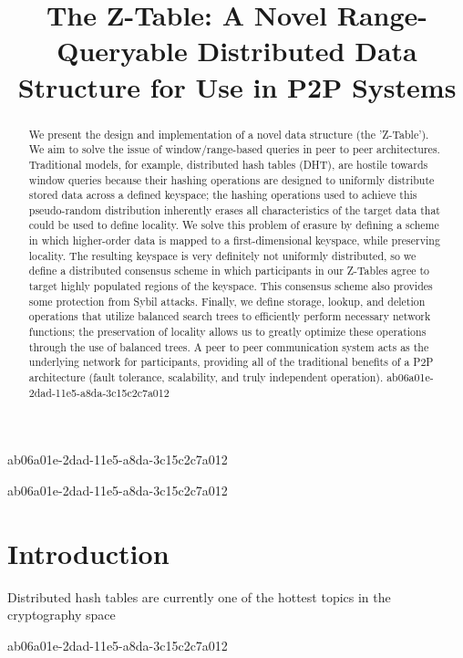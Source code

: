 \documentclass[12pt]{article}
\title{The Z-Table: A Novel Range-Queryable Distributed Data Structure for Use in P2P Systems}
\begin{document}
\maketitle
ab06a01e-2dad-11e5-a8da-3c15c2c7a012
\begin{abstract}
We present the design and implementation of a novel data structure (the 'Z-Table'). We aim to solve the issue of window/range-based queries in peer to peer architectures. Traditional models, for example,  distributed hash tables (DHT), are hostile towards window queries because their hashing operations are designed to uniformly distribute stored data across a defined keyspace; the hashing operations used to achieve this pseudo-random distribution inherently erases all characteristics of the target data that could be used to define locality. We solve this problem of erasure by defining a scheme in which higher-order data is mapped to a first-dimensional keyspace, while preserving locality. The resulting keyspace is very definitely not uniformly distributed, so we define a distributed consensus scheme in which participants in our Z-Tables agree to target highly populated regions of the keyspace. This consensus scheme also provides some protection from Sybil attacks. Finally, we define storage, lookup, and deletion operations that utilize balanced search trees to efficiently perform necessary network functions; the preservation of locality allows us to greatly optimize these operations through the use of balanced trees. A peer to peer communication system acts as the underlying network for participants, providing all of the traditional benefits of a P2P architecture (fault tolerance, scalability, and truly independent operation).
ab06a01e-2dad-11e5-a8da-3c15c2c7a012\end{abstract}


\newpage
ab06a01e-2dad-11e5-a8da-3c15c2c7a012\section{Introduction}
Distributed hash tables are currently one of the hottest topics in the cryptography space~\cite{Stoica:2001dj,Rowstron:2001ea,Ratnasamy:2001wn}

\printbibliography
ab06a01e-2dad-11e5-a8da-3c15c2c7a012
\end{document}
